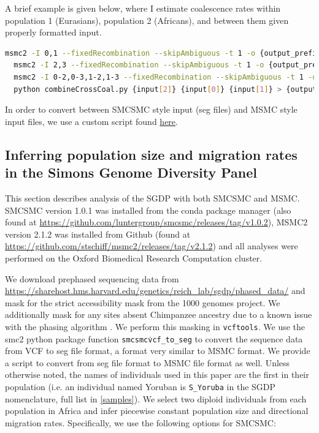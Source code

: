 A brief example is given below, where I estimate coalescence rates within population 1 (Eurasians), population 2 (Africans), and between them given properly formatted input. 

\begin{lstlisting}[language=Bash]
  msmc2 -I 0,1 --fixedRecombination --skipAmbiguous -t 1 -o {output_prefix} {input_string}
  msmc2 -I 2,3 --fixedRecombination --skipAmbiguous -t 1 -o {output_prefix} {input_string}
  msmc2 -I 0-2,0-3,1-2,1-3 --fixedRecombination --skipAmbiguous -t 1 -o {output_prefix} {input_string}
  python combineCrossCoal.py {input[2]} {input[0]} {input[1]} > {output[0]}
\end{lstlisting}

In order to convert between SMCSMC style input (seg files) and MSMC style input files, we use a custom script found \href{https://github.com/Chris1221/ancient_african_admixture/blob/master/pipelines/real_data/py/smc2-to-msmc.py}{here}.

\subsection{Inferring population size and migration rates in the Simons Genome Diversity Panel}

This section describes analysis of the SGDP with both SMCSMC and MSMC. SMCSMC version 1.0.1 was installed from the conda package manager (also found at \url{https://github.com/luntergroup/smcsmc/releases/tag/v1.0.2}), MSMC2 version 2.1.2 was installed from Github (found at \url{https://github.com/stschiff/msmc2/releases/tag/v2.1.2}) and all analyses were performed on the Oxford Biomedical Research Computation cluster. 

We download prephased sequencing data from \url{https://sharehost.hms.harvard.edu/genetics/reich_lab/sgdp/phased_data/} and mask for the strict accessibility mask from the 1000 genomes project. 
We additionally mask for any sites absent Chimpanzee ancestry due to a known issue with the phasing algorithm \cite{Wang2019a}. 
We perform this masking in {\tt vcftools}. We use the \gls{smc2} python package function {\tt smcsmc\.vcf\_to\_seg} to convert the sequence data from VCF to seg file format, a format very similar to MSMC format. 
We provide a script to convert from seg file format to MSMC file format as well. 
Unless otherwise noted, the names of individuals used in this paper are the first in their population (i.e. an individual named Yoruban is {\tt S\_Yoruba} in the SGDP nomenclature, full list in \ref{samples}).  
We select two diploid individuals from each population in Africa  and infer piecewise constant population size and directional migration rates. Specifically, we use the following options for SMCSMC:

